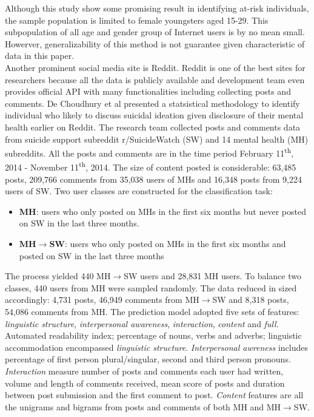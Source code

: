 Although this study show some promising result in identifying at-risk individuals, the sample population is limited to female youngsters aged 15-29. This subpopulation of all age and gender group of Internet users is by no mean small. Howerver, generalizability of this method is not guarantee given characteristic of data in this paper.\\

Another prominent social media site is Reddit. Reddit is one of the best sites for researchers because all the data is publicly available and development team even provides official API with many functionalities including collecting posts and comments. De Choudhury et al \cite{DeChoudhury2016} presented a statsistical methodology to identify individual who likely to discuss suicidal ideation given disclosure of their mental health earlier on Reddit. The research team collected posts and comments data from suicide support subreddit r/SuicideWatch (SW) and 14 mental health (MH) subreddits. All the posts and comments are in the time period February 11\textsuperscript{th}, 2014 - November 11\textsuperscript{th}, 2014. The size of content posted is considerable: 63,485 posts, 209,766 comments from 35,038 users of MHs and 16,348 posts from 9,224 users of SW. Two user classes are constructed for the classification task:
\begin{itemize}
\item \textbf{MH}: users who only posted on MHs in the first six months but never posted on SW in the last three months. 
\item \textbf{MH$\rightarrow$SW}: users who only posted on MHs in the first six months and posted on SW in the last three months
\end{itemize}
The process yielded 440 MH$\rightarrow$SW users and 28,831 MH users. To balance two classes, 440 users from MH were sampled randomly. The data reduced in sized accordingly: 4,731 posts, 46,949 comments from MH$\rightarrow$SW and 8,318 posts, 54,086 comments from  MH. The prediction model adopted five sets of features: \textit{linguistic structure}, \textit{interpersonal awareness}, \textit{interaction}, \textit{content} and \textit{full}. Automated readability index; percentage of nouns, verbs and adverbs; linguistic accommodation encompassed \textit{linguistic structure}. \textit{Interpersonal awreness} includes percentage of first person plural/singular, second and third person pronouns. \textit{Interaction} measure number of posts and comments each user had written, volume and length of comments received, mean score of posts and duration between post submission and the first comment to post. \textit{Content} features are all the unigrams and bigrams from posts and comments of both MH and MH$\rightarrow$SW.\\
